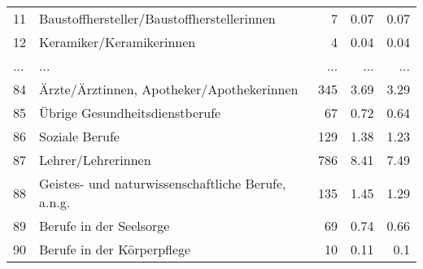\begin{longtable}{lXrrr}
        11 & \multicolumn{1}{X}{Baustoffhersteller/Baustoffherstellerinnen} & %
          \num{7} &
          \num[round-mode=places,round-precision=2]{0.07} &
          \num[round-mode=places,round-precision=2]{0.07} \\
        12 & \multicolumn{1}{X}{Keramiker/Keramikerinnen} & %
          \num{4} &
          \num[round-mode=places,round-precision=2]{0.04} &
          \num[round-mode=places,round-precision=2]{0.04} \\
       ... & ... & ... & ... & ... \\
        84 & \multicolumn{1}{X}{Ärzte/Ärztinnen, Apotheker/Apothekerinnen} & %
          \num{345} &
          \num[round-mode=places,round-precision=2]{3.69} &
          \num[round-mode=places,round-precision=2]{3.29} \\

        85 & \multicolumn{1}{X}{Übrige Gesundheitsdienstberufe} & %
          \num{67} &
          \num[round-mode=places,round-precision=2]{0.72} &
          \num[round-mode=places,round-precision=2]{0.64} \\

        86 & \multicolumn{1}{X}{Soziale Berufe} & %
          \num{129} &
          \num[round-mode=places,round-precision=2]{1.38} &
          \num[round-mode=places,round-precision=2]{1.23} \\

        87 & \multicolumn{1}{X}{Lehrer/Lehrerinnen} & %
          \num{786} &
          \num[round-mode=places,round-precision=2]{8.41} &
          \num[round-mode=places,round-precision=2]{7.49} \\

        88 & \multicolumn{1}{X}{Geistes- und naturwissenschaftliche Berufe, a.n.g.} & %
          \num{135} &
          \num[round-mode=places,round-precision=2]{1.45} &
          \num[round-mode=places,round-precision=2]{1.29} \\

        89 & \multicolumn{1}{X}{Berufe in der Seelsorge} & %
          \num{69} &
          \num[round-mode=places,round-precision=2]{0.74} &
          \num[round-mode=places,round-precision=2]{0.66} \\

        90 & \multicolumn{1}{X}{Berufe in der Körperpflege} & %
          \num{10} &
          \num[round-mode=places,round-precision=2]{0.11} &
          \num[round-mode=places,round-precision=2]{0.1} \\


\end{longtable}
